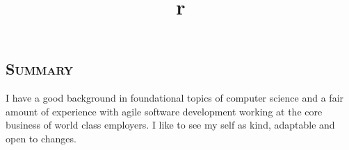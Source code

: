 \hypersetup{backref,pdfpagemode=Full,colorlinks=true,backref}
\addtolength{\oddsidemargin}{-0.43in}
\addtolength{\voffset}{-0.30in}
\addtolength{\textwidth}{1.00in} \addtolength{\textheight}{1.50in}
\renewcommand{\namefont}{\LARGE\emph}
\def\Cplusplus{{\rm C\raise.5ex\hbox{\small ++}}}
\def\CSharp{{\rm C\raise.5ex\hbox{\small \#}}}
\def\first{{\raise.5ex\hbox{\small st}}}
\def\second{{\raise.5ex\hbox{\small nd}}}
\def\third{{\raise.5ex\hbox{\small rd}}}
\def\fourth{{\raise.5ex\hbox{\small th}}}

\address{federicoviscomi@gmail.com \ \ \ \ \ +447801273266 \ \ \ \ \ \ Updated \today}
\begin{resume}
\section{\textsc{Summary}}
I have a good background in foundational topics of computer science
and a fair amount of experience with agile software development working at the core business of world class employers.
I like to see my self as kind, adaptable and open to changes.
\begin{formatb}
\title{r}\\
\\
\body\\
\end{formatb}


\end{resume}
